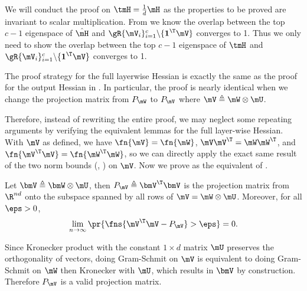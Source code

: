 \begin{proofof}{}
We will conduct the proof on $\tmH=\frac{1}{d}\mH$ as the properties to be proved are invariant to scalar multiplication. From  we know the overlap between the top $c-1$ eigenspace of $\hat\mH$ and $\gR\{\mV_i\}_{i=1}^c\backslash\{\textbf{1}^\T\mV\}$ converges to 1. Thus we only need to show the overlap between the top $c-1$ eigenspace of $\tmH$ and $\gR\{\mV_i\}_{i=1}^c\backslash\{\textbf{1}^\T\mV\}$ converges to 1.

The proof strategy for the full layerwise Hessian is exactly the same as the proof for the output Hessian in . In particular, the proof is nearly identical when we change the projection matrix from $P_\mW$ to $P_\mV$ where $\mV\triangleq \mW\otimes\mU$.

Therefore, instead of rewriting the entire proof, we may neglect some repeating arguments by verifying the equivalent lemmas for the full layer-wise Hessian.
With $\mV$ as defined, we have $\fn{\mV} = \fn{\mW}$, $\mV\mV^\T = \mW\mW^\T$, and $\fn{\mV^\T\mV} = \fn{\mW^\T\mW}$, so we can directly apply the exact same result of the two norm bounds (, ) on $\mV$. Now we prove  as the equivalent of .


\begin{lemma}
\label{lemma:V-projection}
Let $\bmV\triangleq \bmW\otimes \mU$, then $P_\mV\triangleq \bmV^\T\bmV$ is the projection matrix from $\R^{nd}$ onto the subspace spanned by all rows of $\mV=\mW\otimes \mU$. Moreover, for all $\eps>0$, \begin{equation}
    \lim_{n\to\infty}\pr{\fns{\mV^\T\mV-P_\mV}>\eps} = 0.
\end{equation}
\end{lemma}

\begin{proofof}{}
Since Kronecker product with the constant $1\times d$ matrix $\mU$ preserves the orthogonality of vectors, doing Gram-Schmit on $\mV$ is equivalent to doing Gram-Schmit on $\mW$ then Kronecker with $\mU$, which results in $\bmV$ by construction. Therefore $P_\mV$ is a valid projection matrix.


\end{proofof}
\end{proofof}
